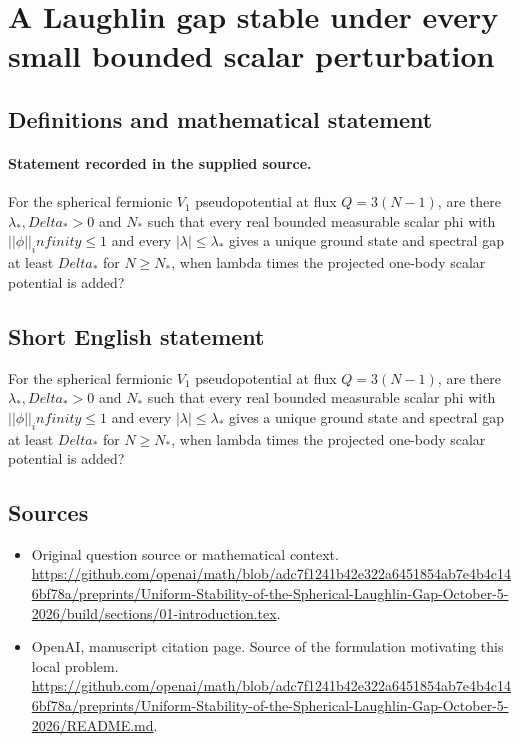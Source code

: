 \documentclass[11pt]{article}
\begin{document}
\section*{A Laughlin gap stable under every small bounded scalar perturbation}\label{statement}
\subsection{Definitions and mathematical statement}
\paragraph{Statement recorded in the supplied source.}
For the spherical fermionic $V_1$ pseudopotential at flux $Q=3(N-1)$, are there $\lambda _*,Delta_*>0$ and $N_*$ such that every real bounded measurable scalar phi with $||\phi ||_infinity\leq 1$ and every $|\lambda |\leq \lambda _*$ gives a unique ground state and spectral gap at least $Delta_*$ for $N\geq N_*$, when lambda times the projected one-body scalar potential is added?
\subsection{Short English statement}
For the spherical fermionic $V_1$ pseudopotential at flux $Q=3(N-1)$, are there $\lambda _*,Delta_*>0$ and $N_*$ such that every real bounded measurable scalar phi with $||\phi ||_infinity\leq 1$ and every $|\lambda |\leq \lambda _*$ gives a unique ground state and spectral gap at least $Delta_*$ for $N\geq N_*$, when lambda times the projected one-body scalar potential is added?
\subsection{Sources}
\begin{itemize}
\item[S1] Original question source or mathematical context.
\url{https://github.com/openai/math/blob/adc7f1241b42e322a6451854ab7e4b4c146bf78a/preprints/Uniform-Stability-of-the-Spherical-Laughlin-Gap-October-5-2026/build/sections/01-introduction.tex}.
\item[S2] OpenAI, manuscript citation page. Source of the formulation motivating this local problem.
\url{https://github.com/openai/math/blob/adc7f1241b42e322a6451854ab7e4b4c146bf78a/preprints/Uniform-Stability-of-the-Spherical-Laughlin-Gap-October-5-2026/README.md}.
\end{itemize}
\end{document}
